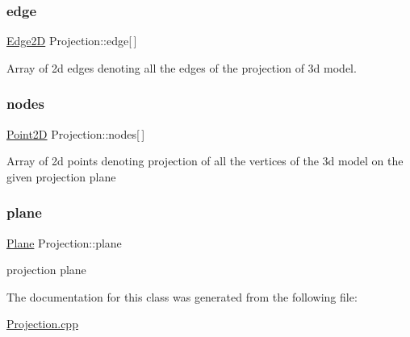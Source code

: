 \subsubsection{\texorpdfstring{edge}{edge}}
{\footnotesize\ttfamily \hyperlink{class_edge2_d}{Edge2D} Projection\+::edge\mbox{[}$\,$\mbox{]}}

Array of 2d edges denoting all the edges of the projection of 3d model. \mbox{\label{class_projection_aac3edf709f45c785e7f5ad7d7f5f42b9}} 
\subsubsection{\texorpdfstring{nodes}{nodes}}
{\footnotesize\ttfamily \hyperlink{class_point2_d}{Point2D} Projection\+::nodes\mbox{[}$\,$\mbox{]}}

Array of 2d points denoting projection of all the vertices of the 3d model on the given projection plane \mbox{\label{class_projection_a5c028a3e5b75d952d5c1a2283409a610}} 
\subsubsection{\texorpdfstring{plane}{plane}}
{\footnotesize\ttfamily \hyperlink{class_plane}{Plane} Projection\+::plane}

projection plane 

The documentation for this class was generated from the following file\+:\begin{DoxyCompactItemize}
\item 
\hyperlink{_projection_8cpp}{Projection.\+cpp}\end{DoxyCompactItemize}
